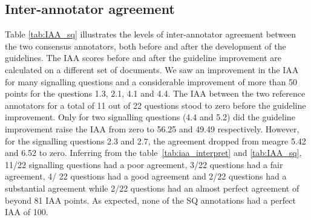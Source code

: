 \documentclass[sn-mathphys,Numbered]{sn-jnl}%
\theoremstyle{thmstyleone}%
\theoremstyle{thmstyletwo}%
\theoremstyle{thmstylethree}%
\begin{document}
%
%
%
\subsection{Inter-annotator agreement}
%
Table \ref{tab:IAA_sq} illustrates the levels of inter-annotator agreement between the two consensus annotators, both before and after the development of the guidelines.
The IAA scores before and after the guideline improvement are calculated on a different set of documents.
We saw an improvement in the IAA for many signalling questions and a considerable improvement of more than 50 points for the questions 1.3, 2.1, 4.1 and 4.4.
The IAA between the two reference annotators for a total of 11 out of 22 questions stood to zero before the guideline improvement.
Only for two signalling questions (4.4 and 5.2) did the guideline improvement raise the IAA from zero to 56.25 and 49.49 respectively.
However, for the signalling questions 2.3 and 2.7, the agreement dropped from meagre 5.42 and 6.52 to zero.
Inferring from the table~\ref{tab:iaa_interpret} and \ref{tab:IAA_sq}, 11/22 signalling questions had a poor agreement, 3/22 questions had a fair agreement, 4/ 22 questions had a good agreement and 2/22 questions had a substantial agreement while 2/22 questions had an almost perfect agreement of beyond 81 IAA points.
As expected, none of the SQ annotations had a perfect IAA of 100.
%
%
%
\end{document}
